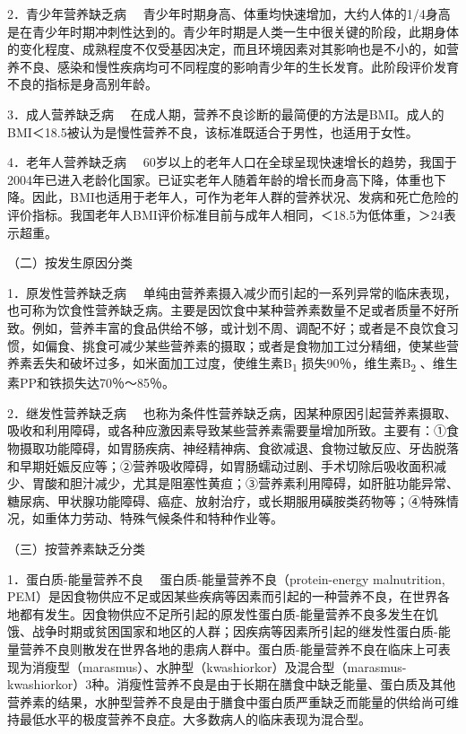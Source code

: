 {2．青少年营养缺乏病}
　青少年时期身高、体重均快速增加，大约人体的1/4身高是在青少年时期冲刺性达到的。青少年时期是人类一生中很关键的阶段，此期身体的变化程度、成熟程度不仅受基因决定，而且环境因素对其影响也是不小的，如营养不良、感染和慢性疾病均可不同程度的影响青少年的生长发育。此阶段评价发育不良的指标是身高别年龄。

{3．成人营养缺乏病}
　在成人期，营养不良诊断的最简便的方法是BMI。成人的BMI＜18.5被认为是慢性营养不良，该标准既适合于男性，也适用于女性。

{4．老年人营养缺乏病}
　60岁以上的老年人口在全球呈现快速增长的趋势，我国于2004年已进入老龄化国家。已证实老年人随着年龄的增长而身高下降，体重也下降。因此，BMI也适用于老年人，可作为老年人群的营养状况、发病和死亡危险的评价指标。我国老年人BMI评价标准目前与成年人相同，＜18.5为低体重，＞24表示超重。

（二）按发生原因分类

{1．原发性营养缺乏病}
　单纯由营养素摄入减少而引起的一系列异常的临床表现，也可称为饮食性营养缺乏病。主要是因饮食中某种营养素数量不足或者质量不好所致。例如，营养丰富的食品供给不够，或计划不周、调配不好；或者是不良饮食习惯，如偏食、挑食可减少某些营养素的摄取；或者是食物加工过分精细，使某些营养素丢失和破坏过多，如米面加工过度，使维生素B\textsubscript{1}
损失90％，维生素B\textsubscript{2} 、维生素PP和铁损失达70％～85％。

{2．继发性营养缺乏病}
　也称为条件性营养缺乏病，因某种原因引起营养素摄取、吸收和利用障碍，或各种应激因素导致某些营养素需要量增加所致。主要有：①食物摄取功能障碍，如胃肠疾病、神经精神病、食欲减退、食物过敏反应、牙齿脱落和早期妊娠反应等；②营养吸收障碍，如胃肠蠕动过剧、手术切除后吸收面积减少、胃酸和胆汁减少，尤其是阻塞性黄疸；③营养素利用障碍，如肝脏功能异常、糖尿病、甲状腺功能障碍、癌症、放射治疗，或长期服用磺胺类药物等；④特殊情况，如重体力劳动、特殊气候条件和特种作业等。

（三）按营养素缺乏分类

{1．蛋白质-能量营养不良} 　蛋白质-能量营养不良（protein-energy
malnutrition,
PEM）是因食物供应不足或因某些疾病等因素而引起的一种营养不良，在世界各地都有发生。因食物供应不足所引起的原发性蛋白质-能量营养不良多发生在饥饿、战争时期或贫困国家和地区的人群；因疾病等因素所引起的继发性蛋白质-能量营养不良则散发在世界各地的患病人群中。蛋白质-能量营养不良在临床上可表现为消瘦型（marasmus）、水肿型（kwashiorkor）及混合型（marasmus-kwashiorkor）3种。消瘦性营养不良是由于长期在膳食中缺乏能量、蛋白质及其他营养素的结果，水肿型营养不良是由于膳食中蛋白质严重缺乏而能量的供给尚可维持最低水平的极度营养不良症。大多数病人的临床表现为混合型。

